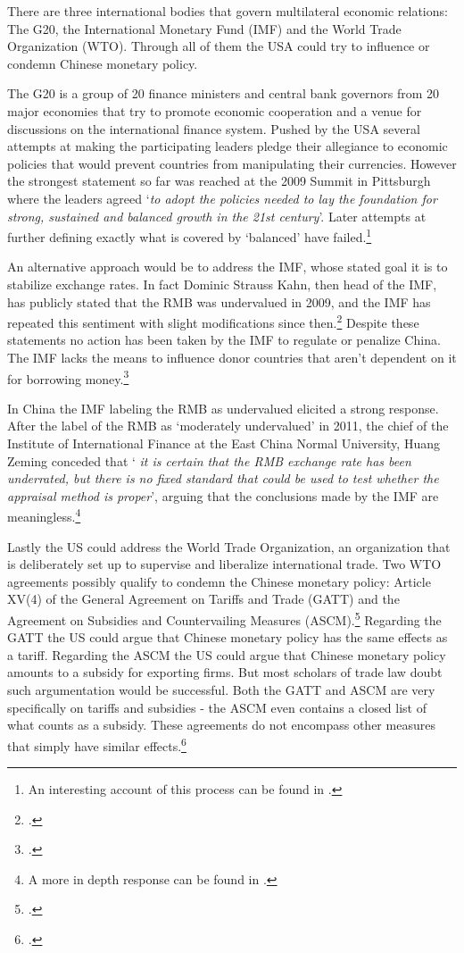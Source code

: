 There are three international bodies that govern multilateral economic relations: The 
G20, the International Monetary Fund (IMF) and the World Trade 
Organization (WTO). Through all of them the USA could try to influence or condemn Chinese monetary policy.

The G20 is a group of 20 finance ministers and central bank governors 
from 20 major economies that try to promote economic cooperation and a 
venue for discussions on the international finance system. Pushed by the 
USA several attempts at making the participating leaders pledge their 
allegiance to economic policies that would prevent countries from 
manipulating their currencies. However the strongest statement so far 
was reached at the 2009 Summit in Pittsburgh where the leaders agreed 
`\textit{to adopt the policies needed to lay the foundation for strong, 
sustained and balanced growth in the 21st century}'. Later attempts at 
further defining exactly what is covered by `balanced' have 
failed.\footnote{An interesting account of this process can be found in 
\cite{Levy11}.}

An alternative approach would be to address the IMF, whose stated goal it
is to stabilize exchange rates. In fact Dominic Strauss Kahn, then head of the IMF, has 
publicly stated that the RMB was undervalued in 2009, and the IMF has 
repeated this sentiment with slight modifications since 
then.\footnote{\cite{reuters09}.}  Despite these statements no action has been taken 
by the IMF to regulate or penalize China. The IMF
lacks the means to influence donor countries that aren't dependent on it for 
borrowing money.\footnote{\cite{Levy2010}.}

In China the IMF labeling the RMB as undervalued elicited a strong 
response. After the label of the RMB as `moderately undervalued' in 
2011, the chief of the Institute of International Finance at the East 
China Normal University, Huang Zeming conceded that `\textit{ it is 
	certain that the RMB exchange rate has been underrated, but there is 
	no fixed standard that could be used to test whether the appraisal 
method is proper}', arguing that the conclusions made by the IMF are 
meaningless.\footnote{A more in depth response can be found in 
\cite{ChinaDaily11}.}

Lastly the US could address the World Trade Organization, an organization that is deliberately set up to supervise 
and liberalize international trade. Two WTO agreements possibly qualify to condemn the Chinese monetary policy: Article XV(4) of the General Agreement on Tariffs and Trade (GATT) and the Agreement on Subsidies and Countervailing Measures (ASCM).\footnote{\cite[pp. 135]{Waibel2010}.} Regarding the GATT the US could argue that Chinese monetary policy has the same effects as a tariff. Regarding the ASCM the US could argue that Chinese monetary policy amounts to a subsidy for exporting firms. But most scholars of trade law doubt such argumentation would be successful. Both the GATT and ASCM are very specifically on tariffs and subsidies - the ASCM even contains a closed list of what counts as a subsidy. These agreements  do not encompass other measures that simply have similar effects.\footnote{\cite{Waibel2010}.}

